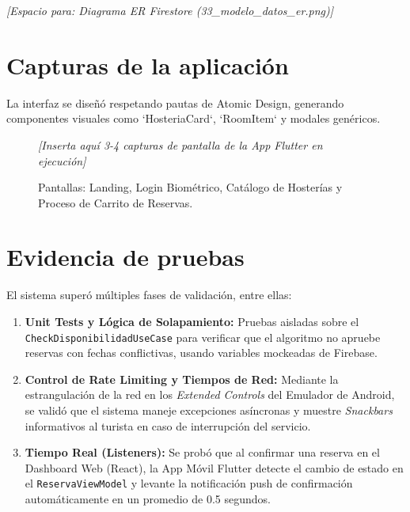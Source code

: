 \documentclass{article}
\begin{document}
\vspace{0.5cm}
\begin{center}
    \textit{[Espacio para: Diagrama ER Firestore (33\_modelo\_datos\_er.png)]}
\end{center}

\section{Capturas de la aplicación}
La interfaz se diseñó respetando pautas de Atomic Design, generando componentes visuales como `HosteriaCard`, `RoomItem` y modales genéricos.

\begin{figure}[H]
    \centering
    \textit{[Inserta aquí 3-4 capturas de pantalla de la App Flutter en ejecución]}
    \caption{Pantallas: Landing, Login Biométrico, Catálogo de Hosterías y Proceso de Carrito de Reservas.}
\end{figure}

\section{Evidencia de pruebas}
El sistema superó múltiples fases de validación, entre ellas:
\begin{enumerate}
    \item \textbf{Unit Tests y Lógica de Solapamiento:} Pruebas aisladas sobre el \texttt{CheckDisponibilidadUseCase} para verificar que el algoritmo no apruebe reservas con fechas conflictivas, usando variables mockeadas de Firebase.
    \item \textbf{Control de Rate Limiting y Tiempos de Red:} Mediante la estrangulación de la red en los \textit{Extended Controls} del Emulador de Android, se validó que el sistema maneje excepciones asíncronas y muestre \textit{Snackbars} informativos al turista en caso de interrupción del servicio.
    \item \textbf{Tiempo Real (Listeners):} Se probó que al confirmar una reserva en el Dashboard Web (React), la App Móvil Flutter detecte el cambio de estado en el \texttt{ReservaViewModel} y levante la notificación push de confirmación automáticamente en un promedio de 0.5 segundos.
\end{enumerate}
\end{document}
